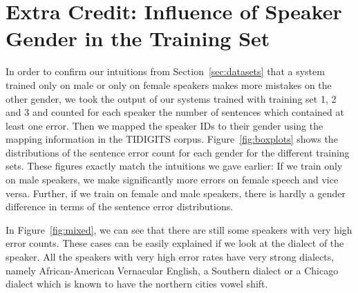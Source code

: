 \documentclass[twocolumn, 11pt]{article}
\begin{document}
\section{Extra Credit: Influence of Speaker Gender in the Training Set}

In order to confirm our intuitions from Section~\ref{sec:datasets} that a system
trained only on male or only on female speakers makes more mistakes on the other
gender, we took the output of our systems trained with training set 1, 2 and 3
and counted for each speaker the number of sentences which contained at least
one error. Then we mapped the speaker IDs to their gender using the mapping
information in the TIDIGITS corpus. Figure~\ref{fig:boxplots} shows the
distributions of the sentence error count for each gender for the different
training sets.  These figures exactly match the intuitions we gave earlier: If
we train only on male speakers, we make significantly more errors on female
speech and vice versa.  Further, if we train on female and male speakers, there
is hardly a gender difference in terms of the sentence error distributions. 

In Figure~\ref{fig:mixed}, we can see that there are still some speakers with
very high error counts.  These cases can be easily explained if we look at the
dialect of the speaker. All the speakers with very high error rates have very
strong dialects, namely African-American Vernacular English, a Southern dialect
or a Chicago dialect which is known to have the northern cities vowel shift.
\end{document}
